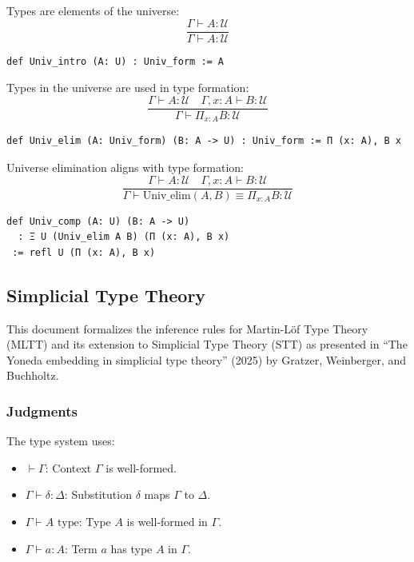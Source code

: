 \documentclass{article}
\begin{document}
\begin{definition}
Types are elements of the universe:
\[
\frac{\Gamma \vdash A : \mathcal{U}}{\Gamma \vdash A : \mathcal{U}}
\]
\begin{lstlisting}[mathescape=true]
def Univ_intro (A: U) : Univ_form := A
\end{lstlisting}
\end{definition}

\begin{definition}
Types in the universe are used in type formation:
\[
\frac{\Gamma \vdash A : \mathcal{U} \quad \Gamma, x : A \vdash B : \mathcal{U}}{\Gamma \vdash \Pi_{x : A} B : \mathcal{U}}
\]
\begin{lstlisting}[mathescape=true]
def Univ_elim (A: Univ_form) (B: A -> U) : Univ_form := Π (x: A), B x
\end{lstlisting}
\end{definition}

\begin{theorem}
Universe elimination aligns with type formation:
\[
 \frac{\Gamma \vdash A : \mathcal{U} \quad \Gamma, x : A \vdash B : \mathcal{U}}{\Gamma \vdash \mathrm{Univ\_elim}(A, B) \equiv \Pi_{x : A} B : \mathcal{U}}
\]
\begin{lstlisting}[mathescape=true]
def Univ_comp (A: U) (B: A -> U)
  : Ξ U (Univ_elim A B) (Π (x: A), B x)
 := refl U (Π (x: A), B x)
\end{lstlisting}
\end{theorem}

\newpage
\subsection{Simplicial Type Theory}

This document formalizes the inference rules for Martin-L\"of Type Theory (MLTT)
and its extension to Simplicial Type Theory (STT) as presented in ``The Yoneda
embedding in simplicial type theory'' (2025) by Gratzer, Weinberger, and Buchholtz.


\subsubsection{Judgments}
The type system uses:
\begin{itemize}
    \item $\vdash \Gamma$: Context $\Gamma$ is well-formed.
    \item $\Gamma \vdash \delta : \Delta$: Substitution $\delta$ maps $\Gamma$ to $\Delta$.
    \item $\Gamma \vdash A \text{ type}$: Type $A$ is well-formed in $\Gamma$.
    \item $\Gamma \vdash a : A$: Term $a$ has type $A$ in $\Gamma$.
\end{itemize}
\end{document}
